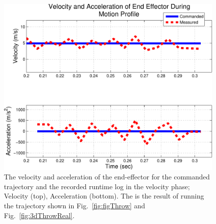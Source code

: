 \begin{figure}[thpb]\label{fig:posPlot}
  \centering
\includegraphics[width=1.0\columnwidth]{./MATLAB/throwTrajRSPacc.pdf}
  \caption{The velocity and acceleration of the end-effector for the commanded trajectory and the recorded runtime log in the velocity phase; Velocity (top), Acceleration (bottom).  The is the result of running the trajectory shown in Fig.~\ref{fig:figThrow} and Fig.~\ref{fig:3dThrowReal}.}
\end{figure}








